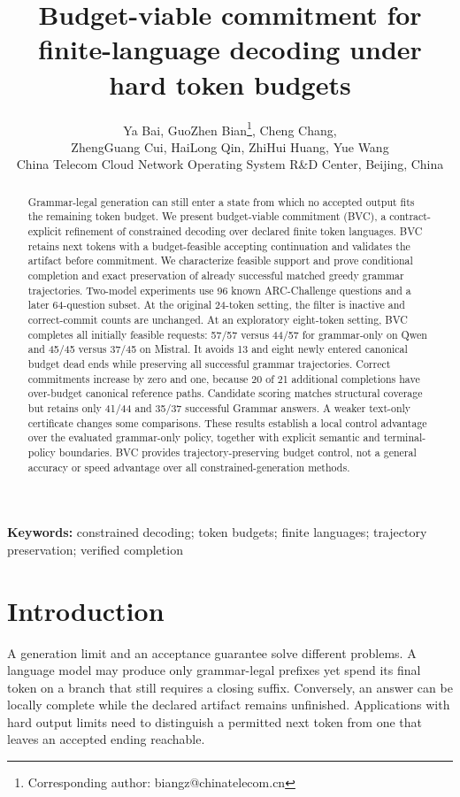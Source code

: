 \documentclass[12pt,a4paper]{article}
\title{Budget-viable commitment for finite-language decoding under hard token budgets}
\author{Ya Bai, GuoZhen Bian\thanks{Corresponding author: biangz@chinatelecom.cn}, Cheng Chang,\\
ZhengGuang Cui, HaiLong Qin, ZhiHui Huang, Yue Wang\\[0.5em]
\small China Telecom Cloud Network Operating System R\&D Center, Beijing, China}
\date{}
\begin{document}
{\singlespacing\maketitle}
\begin{abstract}\singlespacing
Grammar-legal generation can still enter a state from which no accepted output fits the remaining token budget. We present budget-viable commitment (BVC), a contract-explicit refinement of constrained decoding over declared finite token languages. BVC retains next tokens with a budget-feasible accepting continuation and validates the artifact before commitment. We characterize feasible support and prove conditional completion and exact preservation of already successful matched greedy grammar trajectories. Two-model experiments use 96 known ARC-Challenge questions and a later 64-question subset. At the original 24-token setting, the filter is inactive and correct-commit counts are unchanged. At an exploratory eight-token setting, BVC completes all initially feasible requests: 57/57 versus 44/57 for grammar-only on Qwen and 45/45 versus 37/45 on Mistral. It avoids 13 and eight newly entered canonical budget dead ends while preserving all successful grammar trajectories. Correct commitments increase by zero and one, because 20 of 21 additional completions have over-budget canonical reference paths. Candidate scoring matches structural coverage but retains only 41/44 and 35/37 successful Grammar answers. A weaker text-only certificate changes some comparisons. These results establish a local control advantage over the evaluated grammar-only policy, together with explicit semantic and terminal-policy boundaries. BVC provides trajectory-preserving budget control, not a general accuracy or speed advantage over all constrained-generation methods.
\end{abstract}
\noindent\textbf{Keywords:} constrained decoding; token budgets; finite languages; trajectory preservation; verified completion

\section{Introduction}\label{sec:intro}
A generation limit and an acceptance guarantee solve different problems. A language model may produce only grammar-legal prefixes yet spend its final token on a branch that still requires a closing suffix. Conversely, an answer can be locally complete while the declared artifact remains unfinished. Applications with hard output limits need to distinguish a permitted next token from one that leaves an accepted ending reachable.
\end{document}
